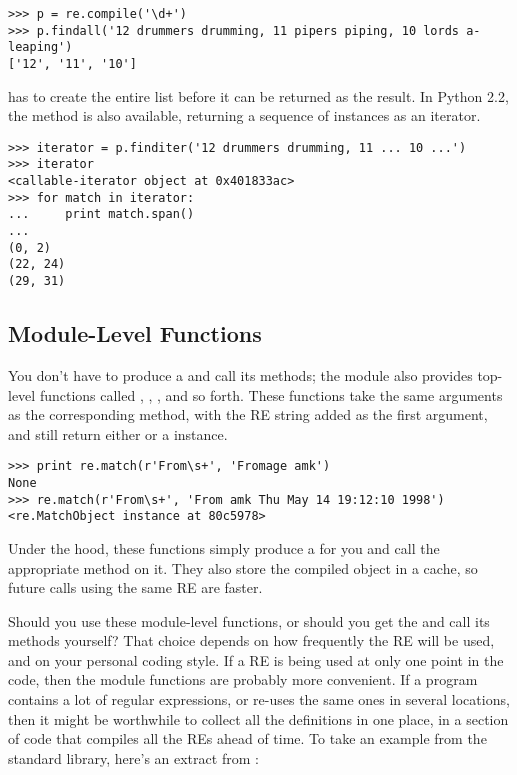 \documentclass{howto}
\begin{document}
\begin{verbatim}
>>> p = re.compile('\d+')
>>> p.findall('12 drummers drumming, 11 pipers piping, 10 lords a-leaping')
['12', '11', '10']
\end{verbatim}

 has to create the entire list before it can be
returned as the result.  In Python 2.2, the  method
is also available, returning a sequence of  instances 
as an iterator.

\begin{verbatim}
>>> iterator = p.finditer('12 drummers drumming, 11 ... 10 ...')
>>> iterator
<callable-iterator object at 0x401833ac>
>>> for match in iterator:
...     print match.span()
...
(0, 2)
(22, 24)
(29, 31)
\end{verbatim}


\subsection{Module-Level Functions}

You don't have to produce a  and call its methods;
the  module also provides top-level functions called
, , , and so
forth.  These functions take the same arguments as the corresponding
 method, with the RE string added as the first
argument, and still return either  or a 
instance.

\begin{verbatim}
>>> print re.match(r'From\s+', 'Fromage amk')
None
>>> re.match(r'From\s+', 'From amk Thu May 14 19:12:10 1998')
<re.MatchObject instance at 80c5978>
\end{verbatim}

Under the hood, these functions simply produce a 
for you and call the appropriate method on it.  They also store the
compiled object in a cache, so future calls using the same
RE are faster.  

Should you use these module-level functions, or should you get the
 and call its methods yourself?  That choice
depends on how frequently the RE will be used, and on your personal
coding style.  If a RE is being used at only one point in the code,
then the module functions are probably more convenient.  If a program
contains a lot of regular expressions, or re-uses the same ones in
several locations, then it might be worthwhile to collect all the
definitions in one place, in a section of code that compiles all the
REs ahead of time.  To take an example from the standard library,
here's an extract from :
\end{document}
